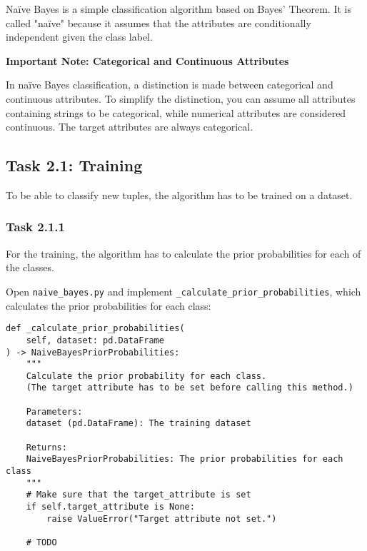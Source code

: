 \documentclass[
english,
smallborders
]{i6prcsht}
\begin{document}
Naïve Bayes is a simple classification algorithm based on Bayes' Theorem. It is called "naïve" because it assumes that the attributes are conditionally independent given the class label.

\vspace*{1mm}

\begin{mdframed}
	\begin{em}
		\textbf{Important Note: Categorical and Continuous Attributes}

		In naïve Bayes classification, a distinction is made between categorical and continuous attributes. To simplify the distinction, you can assume all attributes containing strings to be categorical, while numerical attributes are considered continuous. The target attributes are always categorical.
	\end{em}
\end{mdframed}

\subsection*{Task 2.1: Training}

To be able to classify new tuples, the algorithm has to be trained on a dataset.

\subsubsection*{Task 2.1.1}

For the training, the algorithm has to calculate the prior probabilities for each of the classes.

Open \texttt{naive\_bayes.py} and implement \texttt{\_calculate\_prior\_probabilities}, which calculates the prior probabilities for each class:

\vspace*{0.3cm}

\begin{lstlisting}
def _calculate_prior_probabilities(
	self, dataset: pd.DataFrame
) -> NaiveBayesPriorProbabilities:
	"""
	Calculate the prior probability for each class.
	(The target attribute has to be set before calling this method.)

	Parameters:
	dataset (pd.DataFrame): The training dataset

	Returns:
	NaiveBayesPriorProbabilities: The prior probabilities for each class
	"""
	# Make sure that the target_attribute is set
	if self.target_attribute is None:
		raise ValueError("Target attribute not set.")

	# TODO
\end{lstlisting}
\end{document}
